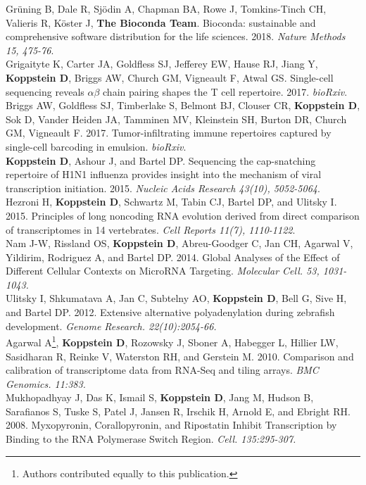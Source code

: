 \documentclass[10pt,a4paper]{article}
\begin{document}
{{{{{{{{\noindent Grüning B, Dale R, Sjödin A, Chapman BA, Rowe J, Tomkins-Tinch CH, Valieris R, Köster J, \textbf{The Bioconda Team}. Bioconda: sustainable and comprehensive software distribution for the life sciences. 2018. \textit{Nature Methods 15, 475-76}.} \vspace{0.4em} \\
{\noindent Grigaityte K, Carter JA, Goldfless SJ, Jefferey EW, Hause RJ, Jiang Y, \textbf{Koppstein D}, Briggs AW, Church GM, Vigneault F, Atwal GS. Single-cell sequencing reveals $\alpha \beta$ chain pairing shapes the T cell repertoire. 2017. \textit{bioRxiv}.} \vspace{-0.8em} \\
{\noindent Briggs AW, Goldfless SJ, Timberlake S, Belmont BJ, Clouser CR, \textbf{Koppstein D}, Sok D, Vander Heiden JA, Tamminen MV, Kleinstein SH, Burton DR, Church GM, Vigneault F. 2017. Tumor-infiltrating immune repertoires captured by single-cell barcoding in emulsion. \textit{bioRxiv}. \vspace{0.5em} \\
{\noindent \textbf{Koppstein D}, Ashour J, and Bartel DP. Sequencing the cap-snatching repertoire of H1N1
influenza provides insight into the mechanism of viral transcription initiation. 2015. \textit{Nucleic Acids Research 43(10), 5052-5064}.} \vspace{0.5em} \\
{\noindent Hezroni H, \textbf{Koppstein D}, Schwartz M, Tabin CJ, Bartel DP, and Ulitsky I. 2015. Principles of long noncoding
RNA evolution derived from direct comparison of transcriptomes in 14 vertebrates. \textit{Cell Reports 11(7), 1110-1122}}. \vspace{0.5em} \\
{\noindent Nam J-W, Rissland OS, \textbf{Koppstein D}, Abreu-Goodger C, Jan CH, Agarwal V, Yildirim, Rodriguez A, and Bartel DP. 2014. Global Analyses of the Effect of Different Cellular Contexts on MicroRNA Targeting. \textit{Molecular Cell. 53, 1031-1043.}} \vspace{0.5em} \\
{\noindent Ulitsky I, Shkumatava A, Jan C, Subtelny AO, \textbf{Koppstein D}, Bell G, Sive H, and Bartel DP. 2012. Extensive alternative polyadenylation during zebrafish development. \textit{Genome Research. 22(10):2054-66.}} \vspace{0.5em} \\
{\noindent Agarwal A\footnote[1]{Authors contributed equally to this publication.}, \textbf{Koppstein D}\footnotemark[1], Rozowsky J, Sboner A, Habegger L, Hillier LW, Sasidharan R, Reinke V, Waterston RH, and Gerstein M. 2010. Comparison and calibration of transcriptome data from RNA-Seq and tiling arrays. \textit{BMC Genomics. 11:383.}} \vspace{0.3em} \\
{\noindent Mukhopadhyay J, Das K, Ismail S, \textbf{Koppstein D}, Jang M, Hudson B, Sarafianos S, Tuske S, Patel J, Jansen R, Irschik H, Arnold E, and Ebright RH. 2008. Myxopyronin, Corallopyronin, and Ripostatin Inhibit Transcription by Binding to the RNA Polymerase Switch Region. \textit{Cell. 135:295-307.}} \vspace{0.3em} \\

}}}}}}}}
\end{document}
